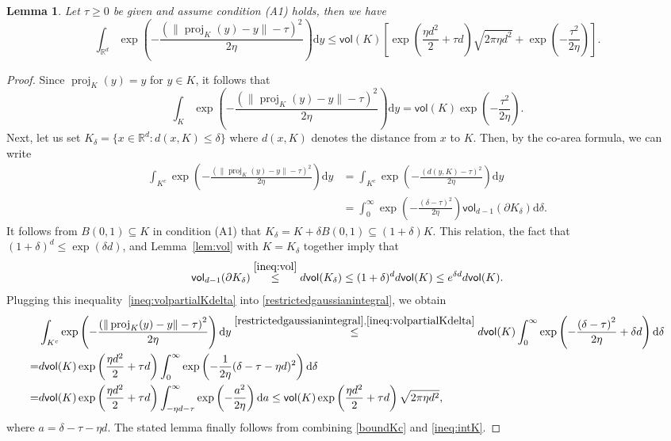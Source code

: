 \documentclass[11pt,letterpaper]{article}
\newcommand{\R}{\mathbb{R}}
\newcommand{\proj}{\operatorname{proj}}
\newcommand{\nn}{\nonumber}
\newcommand{\D}{\mathrm{d}}
\newcommand{\vol}{\mathsf{vol}}
\newcommand{\brac}[1]{\left( #1\right)}
\newtheorem{lemma}[thm]{Lemma}
\begin{document}
\begin{lemma}\label{lem:intR}
Let $\tau\ge 0$ be given and assume condition (A1) holds, then we have
\[
      \int_{\R^d} \exp\brac{-\frac{\brac{\|\proj_K(y)-y\|-\tau}^2}{2\eta}}\D y 
    \le \vol(K) \left[\exp\left(\frac{\eta d^2}{2}+\tau d\right) \sqrt{2\pi \eta d^2}+\exp\brac{-\frac{\tau^2}{2\eta}}\right]. 
\]
\end{lemma}

\begin{proof}
Since $\proj_K(y)=y$ for $y\in K$, it follows that
\begin{equation}\label{ineq:intK}
    \int_K \exp\brac{-\frac{\brac{\|\proj_K(y)-y\|-\tau}^2}{2\eta}}\D y 
    = \vol(K)\exp\brac{-\frac{\tau^2}{2\eta}}.
\end{equation}
    Next, let us set $K_\delta=\{x\in \R^d:d(x,K)\leq \delta\}$ where $d(x,K)$ denotes the distance from $x$ to $K$. Then, by the co-area formula, we can write
	\begin{align}
		\int_{K^c} \exp\left(-\frac{\brac{\|\proj_K(y)-y\|-\tau}^2}{2\eta}\right) \D y & = \int_{K^c} \exp\left(-\frac{\brac{d(y,K)-\tau}^2}{2\eta}\right) \D y \nn \\
		& = \int_0^\infty \exp\left(-\frac{\brac{\delta-\tau}^2}{2\eta}\right) \vol_{d-1}(\partial K_\delta) \D \delta. \label{restrictedgaussianintegral}
	\end{align}
	It follows from $B(0,1) \subseteq K$ in condition (A1) that $K_\delta = K+\delta B(0,1) \subseteq (1+\delta) K$. This relation, the fact that $(1+\delta)^d \le \exp(\delta d)$, and Lemma~\ref{lem:vol} with $K=K_\delta$ together imply that
    \begin{align}
    \label{ineq:volpartialKdelta}
    \vol_{d-1}(\partial K_\delta) \stackrel{\eqref{ineq:vol}}\le d\vol(K_\delta) \le (1+\delta)^d d \vol(K) \le e^{\delta d} d \vol(K).
    \end{align}
Plugging this inequality~\eqref{ineq:volpartialKdelta} into \eqref{restrictedgaussianintegral}, we obtain
	\begin{align}
    \label{boundKc}
		&\int_{K^c} \exp\left(-\frac{\brac{\|\proj_K(y)-y\|-\tau}^2}{2\eta}\right) \D y 
        \stackrel{\eqref{restrictedgaussianintegral},\eqref{ineq:volpartialKdelta}}\le d \vol(K) \int_0^\infty \exp\left(-\frac{\brac{\delta-\tau}^2}{2\eta} + \delta d\right) \D \delta \nonumber \\
		=& d \vol(K) \exp\left(\frac{\eta d^2}{2}+\tau d\right)\int_0^\infty \exp\left(-\frac{1}{2\eta} (\delta-\tau - \eta d)^2 \right) \D \delta \nonumber\\
		=& d \vol(K) \exp\left(\frac{\eta d^2}{2}+\tau d\right)\int_{-\eta d-\tau}^\infty \exp\left(-\frac{a^2}{2\eta}  \right) \D a 
		\le \vol(K) \exp\left(\frac{\eta d^2}{2}+\tau d\right) \sqrt{2\pi \eta d^2}, 
	\end{align}
where $a=\delta -\tau- \eta d$. The stated lemma finally follows from combining \eqref{boundKc} and \eqref{ineq:intK}.
\end{proof}
\end{document}
